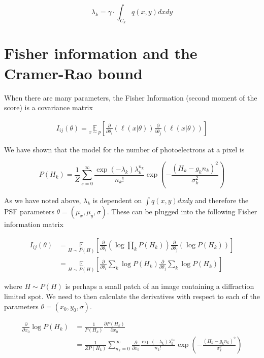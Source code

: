 \documentclass{article}
\begin{document}
\begin{equation*}
\lambda_{k} = \gamma\cdot\int_{C_{k}} q(x,y)dxdy
\end{equation*}

\section{Fisher information and the Cramer-Rao bound}

When there are many parameters, the Fisher Information (second moment of the score) is a covariance matrix

\begin{align*}
I_{ij}(\theta) = \underset{{x\sim p}}{\mathbb{E}}\left[\frac{\partial}{\partial\theta_{i}} \left(\ell(x|\theta)\right)\frac{\partial}{\partial\theta_{j}} \left(\ell(x|\theta)\right)\right]
\end{align*}

We have shown that the model for the number of photoelectrons at a pixel is

\begin{equation*}
P(H_{k}) = \frac{1}{Z}\sum_{s=0}^{\infty}\frac{\exp\left({-\lambda_{k}}\right)\lambda_{k}^{n_{k}}}{n_{k}!}\exp\left(-\frac{(H_{k}-g_{k}n_{k})^{2}}{\sigma_{k}^{2}}\right)
\end{equation*}

As we have noted above, $\lambda_{k}$ is dependent on $\int q(x,y)dxdy$ and therefore the PSF parameters $\theta = (\mu_{x},\mu_{y},\sigma)$. These can be plugged into the following Fisher information matrix

\begin{align*}
I_{ij}(\theta) &= \underset{{H\sim P(H)}}{\mathbb{E}}\left[\frac{\partial}{\partial\theta_{i}} \left(\log \prod_{k} P(H_{k})\right)\frac{\partial}{\partial\theta_{j}} \left(\log P(H_{k})\right)\right]\\
&= \underset{{H\sim P(H)}}{\mathbb{E}}\left[\frac{\partial}{\partial\theta_{i}} \sum_{k}\log P(H_{k})\frac{\partial}{\partial\theta_{j}}\sum_{k} \log P(H_{k})\right]
\end{align*}

where $H\sim P(H)$ is perhaps a small patch of an image containing a diffraction limited spot. We need to then calculate the derivatives with respect to each of the parameters $\theta = (x_{0},y_{0},\sigma)$. 

\begin{align*}
\frac{\partial}{\partial x_{0}}\log P(H_{k}) &= \frac{1}{P(H_{k})} \frac{\partial P(H_{k})}{\partial x_{0}}\\
&=  \frac{1}{ZP(H_{k})}\sum_{n_{k}=0}^{\infty}\frac{\partial}{\partial x_{0}}\frac{\exp\left({-\lambda_{k}}\right)\lambda_{k}^{n_{k}}}{n_{k}!}\exp\left(-\frac{(H_{k}-g_{k}n_{k})^{2}}{\sigma_{k}^{2}}\right)\\
\end{align*}
\end{document}

